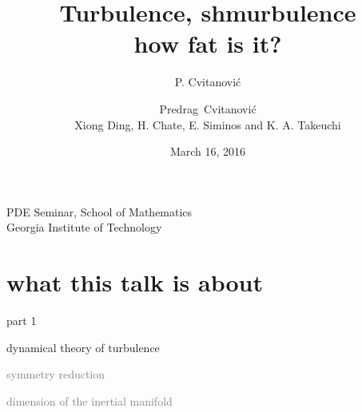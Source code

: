 




\title{\huge Turbulence, shmurbulence  \\ how fat is it?}
\author{P. Cvitanovi\'c}
\author[Cvitanovi\'c]
{
  \textcolor{green!50!black}{
  {Predrag~Cvitanovi\'c \\
  Xiong Ding, H. Chate, E. Siminos and K. A. Takeuchi
  }	%
  }
}
\institute
{
PDE Seminar, School of Mathematics \\
Georgia Institute of Technology
 }
\date{March 16, 2016}



\begin{frame}
  \titlepage
\end{frame}


\section[what this talk is about]
 {what this talk is about}

\begin{frame}{part 1}
\begin{enumerate}
              \item {\Large
dynamical theory of turbulence
                  }\textcolor{gray}{\small
              \item
\statesp
              \item
symmetry reduction
              \item
dimension of the inertial manifold
                    }
            \end{enumerate}
\end{frame}




